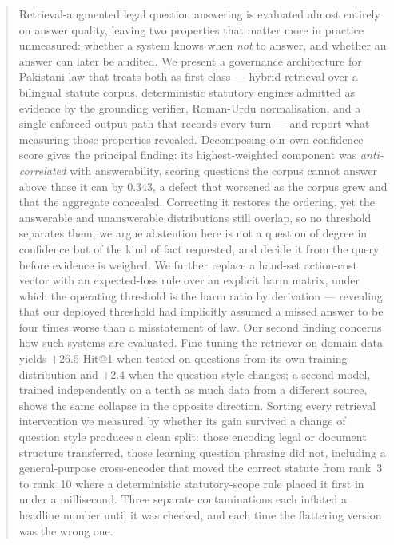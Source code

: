 \documentclass[conference]{IEEEtran}
\begin{document}
\begin{abstract}
Retrieval-augmented legal question answering is evaluated almost entirely on
answer quality, leaving two properties that matter more in practice unmeasured:
whether a system knows when \emph{not} to answer, and whether an answer can
later be audited. We present a governance architecture for Pakistani law that
treats both as first-class --- hybrid retrieval over a bilingual statute corpus,
deterministic statutory engines admitted as evidence by the grounding verifier,
Roman-Urdu normalisation, and a single enforced output path that records every
turn --- and report what measuring those properties revealed. Decomposing our
own confidence score gives the principal finding: its highest-weighted component
was \emph{anti-correlated} with answerability, scoring questions the corpus
cannot answer above those it can by $0.343$, a defect that worsened as the
corpus grew and that the aggregate concealed. Correcting it restores the
ordering, yet the answerable and unanswerable distributions still overlap, so no
threshold separates them; we argue abstention here is not a question of degree
in confidence but of the kind of fact requested, and decide it from the query
before evidence is weighed. We further replace a hand-set action-cost vector
with an expected-loss rule over an explicit harm matrix, under which the
operating threshold is the harm ratio by derivation --- revealing that our
deployed threshold had implicitly assumed a missed answer to be four times worse
than a misstatement of law. Our second finding concerns how such systems are
evaluated. Fine-tuning the retriever on domain data yields $+26.5$ Hit@1 when
tested on questions from its own training distribution and $+2.4$ when the
question style changes; a second model, trained independently on a tenth as much
data from a different source, shows the same collapse in the opposite direction.
Sorting every retrieval intervention we measured by whether its gain survived a
change of question style produces a clean split: those encoding legal or
document structure transferred, those learning question phrasing did not,
including a general-purpose cross-encoder that moved the correct statute from
rank~3 to rank~10 where a deterministic statutory-scope rule placed it first in
under a millisecond. Three separate contaminations each inflated a headline number until it
was checked, and each time the flattering version was the wrong one.
\end{abstract}
\end{document}

